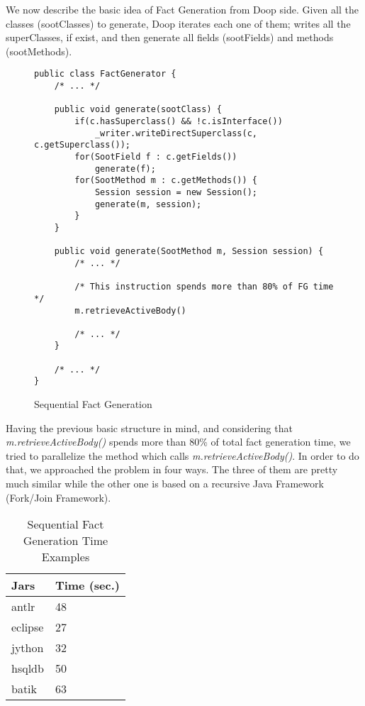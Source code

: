 \documentclass{dithesis}
\begin{document}
    We now describe the basic idea of Fact Generation from Doop side. Given all the classes (sootClasses) to generate, Doop iterates each one of them; writes all the superClasses, if exist, and then generate all fields (sootFields) and methods (sootMethods). 
    \begin{figure}[H]
\begin{lstlisting}
public class FactGenerator {
    /* ... */

    public void generate(sootClass) {
        if(c.hasSuperclass() && !c.isInterface())
            _writer.writeDirectSuperclass(c, c.getSuperclass());
        for(SootField f : c.getFields())
            generate(f);
        for(SootMethod m : c.getMethods()) {
            Session session = new Session();
            generate(m, session);
        }
    }

    public void generate(SootMethod m, Session session) {
        /* ... */
        
        /* This instruction spends more than 80% of FG time */
        m.retrieveActiveBody() 
        
        /* ... */
    }

    /* ... */
}
\end{lstlisting}
    \caption{Sequential Fact Generation}
    \end{figure}

    Having the previous basic structure in mind, and considering that \textit{m.retrieveActiveBody()} spends more than 80\% of total fact generation time, we tried to parallelize the method which calls \textit{m.retrieveActiveBody()}. In order to do that, we approached the problem in four ways. The three of them are pretty much similar while the other one is based on a recursive Java Framework (Fork/Join Framework).
    \begin{table}[H]
		\centering
\begin{tabular}{@{}ll@{}}
\toprule
\textbf{Jars} & \textbf{Time (sec.)} \\ \midrule
antlr          & 48                    \\
eclipse        & 27                    \\
jython         & 32                    \\
hsqldb         & 50                    \\
batik          & 63                    \\ \bottomrule
\end{tabular}
		\caption{Sequential Fact Generation Time Examples}
	\end{table}
\end{document}
